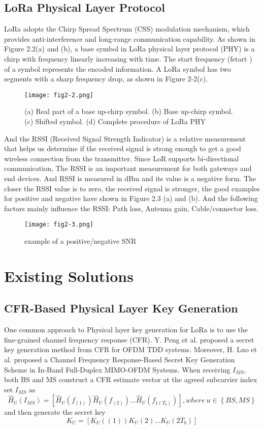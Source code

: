 \subsection{LoRa Physical Layer Protocol}
LoRa adopts the Chirp Spread Spectrum (CSS) modulation mechanism, which provides anti-interference and long-range communication capability. As shown in Figure 2.2(a) and (b), a base symbol in LoRa physical layer protocol (PHY) is a chirp with frequency linearly increasing with time. The start frequency (fstart ) of a symbol represents the encoded information. A LoRa symbol has two segments with a sharp frequency drop, as shown in Figure 2-2(c).
\begin{figure}
  \centering
  \texttt{[image: fig2-2.png]}
  \caption{(a) Real part of a base up-chirp symbol. (b) Base up-chirp symbol. (c) Shifted symbol. (d) Complete procedure of LoRa PHY\cite{10.1145/3546869}}
  \label{fig:2-2}
\end{figure}
And the RSSI (Received Signal Strength Indicator) is a relative measurement that helps us determine if the received signal is strong enough to get a good wireless connection from the transmitter. Since LoR supports bi-directional communication, The RSSI is an important measurement for both gateways and end devices. And RSSI is measured in dBm and its value is a negative form. The closer the RSSI value is to zero, the received signal is stronger, the good examples for positive and negative have shown in Figure 2.3 (a) and (b)\cite{rssiandsnrfigure}. And the following factors mainly influence the RSSI: Path loss, Antenna gain, Cable/connector loss.
\begin{figure}
  \centering
  \texttt{[image: fig2-3.png]}
  \caption{example of a positive/negative SNR}
  \label{fig:2-3}
\end{figure}

\section{Existing Solutions}
\subsection{CFR-Based Physical Layer Key Generation}
One common approach to Physical layer key generation for LoRa is to use the fine-grained channel frequency response (CFR). Y. Peng et al. proposed a secret key generation method from CFR for OFDM TDD systems\cite{7054386}. Moreover, H. Luo et al. proposed a Channel Frequency Response-Based Secret Key Generation Scheme in In-Band Full-Duplex MIMO-OFDM Systems\cite{10158732}. When receiving \(I_{MS}\), both BS and MS construct a CFR estimate vector at the agreed subcarrier index set \(I_{MS}\) as
\begin{equation} 
  \hat{H}_{U}(I_{MS})   = \left [ \hat{H}_{U}(f_{(1)})\hat{H}_{U}(f_{(2)}) ...\hat{H}_{U}(f_{1(T_{b})}) \right ], where\ u\in \left \{ BS, MS  \right \}   
\end{equation} 
and then generate the secret key
\begin{equation} 
  K_{U}  = \left [ K_{U}({(1)})K_{U}{(2)} ...K_{U}({2T_{b}}) \right ]
\end{equation} 


